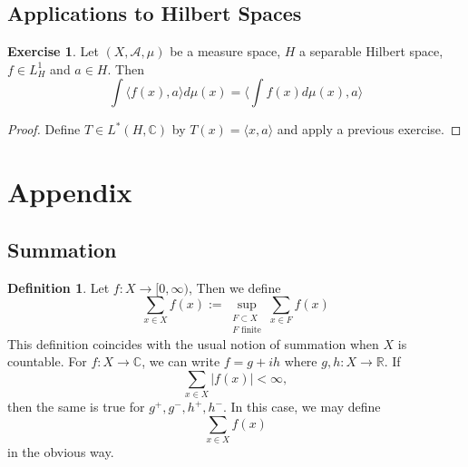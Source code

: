 \documentclass[12pt]{amsart}
\theoremstyle{definition}
\newtheorem{defn}[definition]{Definition}
\newtheorem{ex}[definition]{Exercise}
\newcommand{\C}{\mathbb{C}}
\newcommand{\R}{\mathbb{R}}
\newcommand{\MA}{\mathcal{A}}
\renewcommand{\r}{\rangle}
\renewcommand{\l}{\langle}
\newcommand{\Rg}{[0,\infty)}
\newcommand{\lex}[1]{\label{ex:#1}}
\newcommand{\ld}[1]{\label{defn:#1}}
\begin{document}
	
	
	
	
	
	
	
	
	
	
	
	
	
	
	
	
	
	\newpage
	\subsection{Applications to Hilbert Spaces}	
	
	\begin{ex} \lex{00000} 
	Let $(X, \MA, \mu)$ be a measure space, $H$ a separable Hilbert space, $f \in L^1_H$ and $a \in H$. Then $$\int \l f(x), a \r d\mu(x) = \bigg \l \int f(x) d \mu(x) , a\bigg \r$$ 
	\end{ex}	
	
	\begin{proof}
	Define $T \in L^*(H, \C)$ by $T(x) = \l x, a \r$ and apply a previous exercise.
	\end{proof}
	
	
	
	
	
	
	
	
	
	
	
	
	
	
	
	
	
	
	
	
	
	
	
	
	
	
	
	

	
	

	\newpage
	\section{Appendix}
	
	\subsection{Summation}
	
	\begin{defn} \ld{00000} 
		Let $f:X \rightarrow \Rg$, Then we define $$\sum_{x \in X} f(x) := \sup_{\substack{F \subset X \\ F \text{ finite}}} \sum_{x \in F} f(x)$$ This definition coincides with the usual notion of summation when $X$ is countable. For $f:X \rightarrow \C$, we can write $f = g +ih$ where $g,h:X \rightarrow \R$. If $$\sum_{x \in X}|f(x)| < \infty,$$ then the same is true for $g^+,g^-,h^+,h^-$. In this case, we may define $$\sum_{x \in X} f(x)$$ in the obvious way.
	\end{defn} 
	
\end{document}
